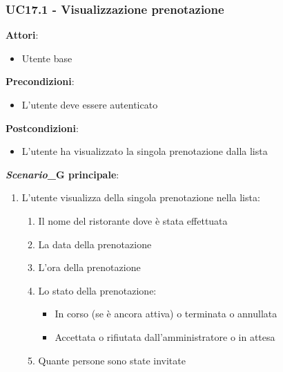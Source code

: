 \subsubsection{UC17.1 - Visualizzazione prenotazione}\label{usecase:17_1}
\textbf{Attori}:
\begin{itemize}
    \item Utente base
\end{itemize}
\textbf{Precondizioni}:
\begin{itemize}
    \item L'utente deve essere autenticato
\end{itemize}
\textbf{Postcondizioni}:
\begin{itemize}
    \item L'utente ha visualizzato la singola prenotazione dalla lista
\end{itemize}
\textbf{\textit{Scenario}_G principale}:
\begin{enumerate}
    \item L'utente visualizza della singola prenotazione nella lista:
    \begin{enumerate}
        \item Il nome del ristorante dove è stata effettuata
        \item La data della prenotazione
        \item L'ora della prenotazione
        \item Lo stato della prenotazione:
            \begin{itemize}
                \item In corso (se è ancora attiva) o terminata  o annullata
                \item Accettata o rifiutata dall'amministratore o in attesa
        \end{itemize}
        \item Quante persone sono state invitate
    \end{enumerate}
\end{enumerate}
\newpage